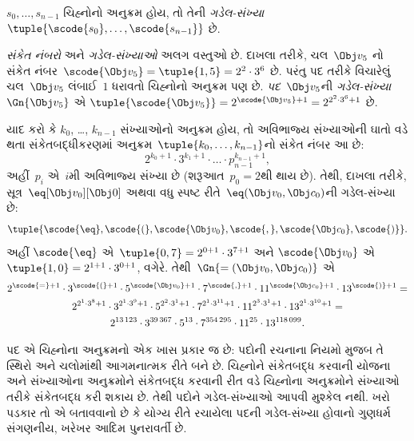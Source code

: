 \begin{defn}
$s_0, \dots, s_{n-1}$ ચિહ્નોનો અનુક્રમ
હોય, તો તેની \emph{ગડેલ-સંખ્યા}
$\tuple{\scode{s_0}, \dots, \scode{s_{n-1}}}$ છે.
\end{defn}

\begin{explain}
\emph{સંકેત નંબરો} અને \emph{ગડેલ-સંખ્યાઓ}
અલગ વસ્તુઓ છે. દાખલા તરીકે, ચલ~$\Obj v_5$
નો સંકેત નંબર~$\scode{\Obj
  v_5} = \tuple{1, 5} = 2^2\cdot 3^6$ છે.
પરંતુ પદ તરીકે વિચારેલું ચલ~$\Obj v_5$
લંબાઈ~$1$ ધરાવતો ચિહ્નોનો અનુક્રમ પણ
છે. \emph{પદ}~$\Obj v_5$ની
\emph{ગડેલ-સંખ્યા}~$\Gn{\Obj v_5}$ એ
$\tuple{\scode{\Obj v_5}} = 2^{\scode{\Obj
    v_5} + 1} = 2^{2^2\cdot 3^6 + 1}$ છે.
\end{explain}

\begin{ex}
યાદ કરો કે $k_0$, \dots, $k_{n-1}$
સંખ્યાઓનો અનુક્રમ હોય, તો અવિભાજ્ય
સંખ્યાઓની ઘાતો વડે થતા સંકેતબદ્ધીકરણમાં
અનુક્રમ~$\tuple{k_0, \dots, k_{n-1}}$નો
સંકેત નંબર આ છે:
\[
2^{k_0+1}\cdot3^{k_1+1}\cdot \dots \cdot p_{n-1}^{k_{n-1}+1},
\]
અહીં~$p_i$ એ~$i$મી અવિભાજ્ય સંખ્યા છે
(શરૂઆત~$p_0 = 2$થી થાય છે). તેથી,
દાખલા તરીકે, સૂત્ર~$\eq[\Obj v_0][\Obj 0]$
અથવા વધુ સ્પષ્ટ રીતે~${\eq}(\Obj v_0,\Obj c_0)$ની
ગડેલ-સંખ્યા છે:
\[
\tuple{\scode{\eq},\scode{(},\scode{\Obj v_0},\scode{,}, \scode{\Obj
    c_0},\scode{)}}.
\]
અહીં $\scode{\eq}$ એ~$\tuple{0,7} = 2^{0+1}\cdot
3^{7+1}$ અને $\scode{\Obj v_0}$ એ~$\tuple{1,0} = 2^{1+1}\cdot3^{0+1}$,
વગેરે. તેથી~$\Gn{=(\Obj v_0,\Obj c_0)}$ એ
\begin{multline*}
2^{\scode{=} + 1}\cdot 3^{\scode{(}+1}\cdot 5^{\scode{\Obj v_0}+1}
\cdot 7^{\scode{,} + 1} \cdot 11^{\scode{\Obj c_0}+1} \cdot
13^{\scode{)}+1} = \\
2^{2^1\cdot 3^8 + 1}\cdot 3^{2^1\cdot 3^9+1}\cdot 5^{2^2\cdot 3^1+1}
\cdot 7^{2^1\cdot 3^{11} + 1} \cdot 11^{2^3\cdot3^1+1} \cdot
13^{2^1\cdot3^{10}+1} = \\
2^{13\,123}\cdot 3^{39\,367}\cdot 5^{13}\cdot 7^{354\,295}\cdot11^{25}\cdot13^{118\,099}.
\end{multline*}
\end{ex}
\endgroup


\begingroup
\makeatletter{}\makeatother

\label{guunit:OLP-0283}


\begin{explain}
પદ એ ચિહ્નોના અનુક્રમનો એક ખાસ પ્રકાર
જ છે: પદોની રચનાના નિયમો મુજબ તે
સ્થિરો અને ચલોમાંથી આગમનાત્મક રીતે
બને છે. ચિહ્નોને સંકેતબદ્ધ કરવાની યોજના
અને સંખ્યાઓના અનુક્રમોને સંકેતબદ્ધ કરવાની
રીત વડે ચિહ્નોના અનુક્રમોને સંખ્યાઓ તરીકે
સંકેતબદ્ધ કરી શકાય છે. તેથી પદોને
ગડેલ-સંખ્યાઓ આપવી મુશ્કેલ નથી.
ખરો પડકાર તો એ બતાવવાનો છે કે
યોગ્ય રીતે રચાયેલા પદની ગડેલ-સંખ્યા
હોવાનો ગુણધર્મ સંગણનીય, ખરેખર આદિમ
પુનરાવર્તી છે.
\end{explain}

